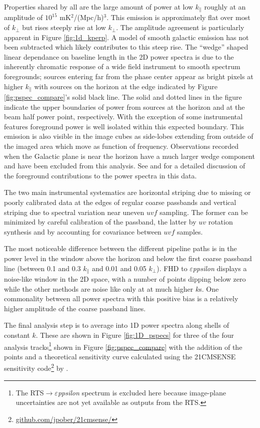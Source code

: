 \documentclass[twolcolumn]{emulateapj}
\def\eppsilon{{\it $\varepsilon$ppsilon}}
\def\dilloncite{\cite{PhysRevD.91.123011} }
\begin{document}
Properties shared by all are the large amount of power at low $k_{\parallel}$ roughly at an amplitude of $10^{15}$ mK$^2$/(Mpc/h)$^3$. This emission is approximately flat over most of $k_{\perp}$ but rises steeply rise at low $k_\perp$. The amplitude agreement is particularly apparent in Figure \ref{fig:1d_kperp}. A model of smooth galactic emission has not been subtracted which likely contributes to this steep rise. The ``wedge'' shaped linear dependance on baseline length in the 2D power spectra is due to the inherently chromatic response of a wide field instrument to smooth spectrum foregrounds; sources entering far from the phase center appear as bright pixels at higher $k_\parallel$ with sources on the horizon at the edge indicated by Figure \ref{fig:pspec_compare}'s  solid black line. The solid and dotted lines in the figure indicate the upper boundaries of power from sources at the horizon and at the beam half power point, respectively.  With the exception of some instrumental features foreground power is well isolated within this expected boundary. This emission is also visible in the image cubes as side-lobes extending from outside of the imaged area which move as function of frequency.  Observations recorded when the Galactic plane is near the horizon have a much larger wedge component and have been excluded from this analysis. See \cite{2015ApJ...804...14T} and \cite{2015ApJ...807L..28T} for a detailed discussion of the foreground contributions to the power spectra in this data. 

The two main instrumental systematics are horizontal striping due to missing or poorly calibrated data at the edges of regular coarse passbands and vertical striping due to spectral variation near uneven $uvf$ sampling. The former can be minimized by careful calibration of the passband, the latter by $uv$ rotation synthesis and by accounting for covariance between $uvf$ samples. 

The most noticeable difference between the different pipeline paths is in the power level in the window above the horizon and below the first coarse passband line (between 0.1 and 0.3 $k_\parallel$ and 0.01 and 0.05 $k_\perp$). FHD to \eppsilon{} displays a noise-like window in the 2D space, with a number of points dipping below zero while the other methods are noise like only at at much higher $k$s.  One commonality between all power spectra with this positive bias is a relatively higher amplitude of the coarse passband lines. 


The final analysis step is to average into 1D power spectra along shells of constant $k$. These are shown in Figure \ref{fig:1D_pspecs} for three of the four analysis tracks\footnote{The RTS$\to$\eppsilon{} spectrum is excluded here because image-plane uncertainties are not yet available as outputs from the RTS.} shown in Figure \ref{fig:pspec_compare} with the addition of the \dilloncite{} points and a theoretical sensitivity curve calculated using the 21CMSENSE sensitivity code\footnote{\url{github.com/jpober/21cmsense/}} by \cite{Pober:2014p10390}.
\end{document}
